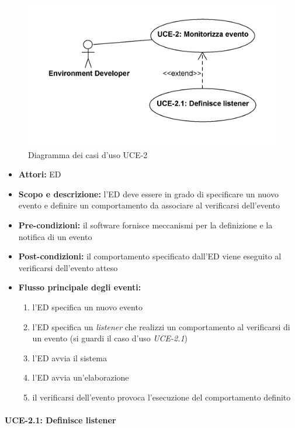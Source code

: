 
\begin{figure}
\centering
\includegraphics[width=1.1\textwidth]{Immagini/Capitolo2/UseCases/UCE-2.png}
\caption{Diagramma dei casi d'uso UCE-2}\label{fig:uc-uce-2}
\end{figure}


\begin{itemize}
	\item \textbf{Attori:} ED
	\item \textbf{Scopo e descrizione:} l'ED deve essere in grado di specificare un nuovo evento e definire un comportamento da associare al verificarsi dell'evento
	\item \textbf{Pre-condizioni:} il software fornisce meccanismi per la definizione e la notifica di un evento
	\item \textbf{Post-condizioni:} il comportamento specificato dall'ED viene eseguito al verificarsi dell'evento atteso
	\item \textbf{Flusso principale degli eventi:}
		\begin{enumerate}
			\item l'ED specifica un nuovo evento
			\item l'ED specifica un \emph{listener} che realizzi un comportamento al verificarsi di un evento (si guardi il caso d'uso \emph{UCE-2.1})
			\item l'ED avvia il sistema
			\item l'ED avvia un'elaborazione
			\item il verificarsi dell'evento provoca l'esecuzione del comportamento definito
		\end{enumerate}
\end{itemize}


\paragraph{UCE-2.1: Definisce listener}

